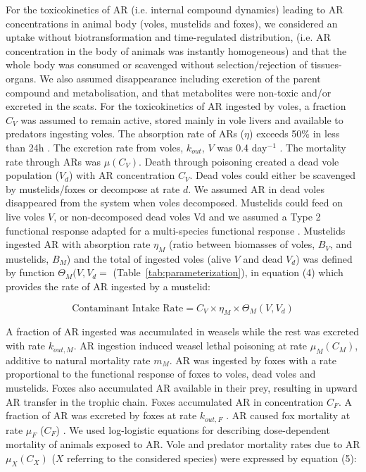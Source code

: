 \documentclass[11pt]{article}
\begin{document}
For the toxicokinetics of AR (i.e. internal compound dynamics) leading to AR concentrations in animal body (voles, mustelids and foxes), we considered an uptake without biotransformation and time-regulated distribution, (i.e. AR concentration in the body of animals was instantly homogeneous) and that the whole body was consumed or scavenged without selection/rejection of tissues-organs. We also assumed disappearance including excretion of the parent compound and metabolisation, and that metabolites were non-toxic and/or excreted in the scats. 
For the toxicokinetics of AR ingested by voles, a fraction $C_V$ was assumed to remain active, stored mainly in vole livers and available to predators ingesting voles. The absorption rate of ARs ($\eta$) exceeds 50\% in less than 24h \citep{Jacquot2013}. The excretion rate from voles, $k_{out}$, $V$ was 0.4 day$^{-1}$ \citep{Sage2008}. The mortality rate through ARs was $\mu(C_V)$. Death through poisoning created a dead vole population ($V_d$) with AR concentration $C_V$. Dead voles could either be scavenged by mustelids/foxes or decompose at rate $d$. We assumed AR in dead voles disappeared from the system when voles decomposed. 
Mustelids could feed on live voles $V$, or non-decomposed dead voles Vd and we assumed a Type 2 functional response adapted for a multi-species functional response \citep{Baudrot2016}. Mustelids ingested AR with absorption rate $\eta_M$ (ratio between biomasses of voles, $B_V$, and mustelids, $B_M$) and the total of ingested voles (alive $V$ and dead $V_d$) was defined by function $\Theta_M (V,V_d=$ (Table~\ref{tab:parameterization}), in equation (4) which provides the rate of AR ingested by a mustelid:

\begin{equation}
\text{Contaminant Intake Rate} = C_V \times \eta_M \times \Theta_M(V,V_d)
\end{equation}

A fraction of AR ingested was accumulated in weasels while the rest was excreted with rate $k_{out,M}$. AR ingestion induced weasel lethal poisoning at rate $\mu_M(C_M)$, additive to natural mortality rate $m_M$.
AR was ingested by foxes with a rate proportional to the functional response of foxes to voles, dead voles and mustelids. Foxes also accumulated AR available in their prey, resulting in upward AR transfer in the trophic chain. Foxes accumulated AR in concentration $C_F$. A fraction of AR was excreted by foxes at rate $k_{out,F}$ \citep{Sage2008}. AR caused fox mortality at rate $\mu_F$ ($C_F$) \citep{Sage2010}.
We used log-logistic equations for describing dose-dependent mortality of animals exposed to AR. Vole and predator mortality rates due to AR $\mu_X(C_X)$ ($X$ referring to the considered species) were expressed by equation (5):
\end{document}
